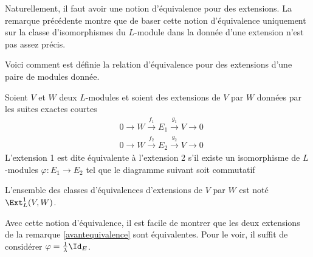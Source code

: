 Naturellement, il faut avoir une notion d'équivalence pour des extensions. La remarque précédente montre que de baser cette notion d'équivalence uniquement sur la classe d'isomorphismes du $L$-module dans la donnée d'une extension n'est pas assez précis. 

Voici comment est définie la relation d'équivalence pour des extensions d'une paire de modules donnée. 

\begin{Def} \label{GROS} Soient $V$ et $W$ deux $L$-modules et soient des extensions de $V$ par $W$ données par les suites exactes courtes
\begin{align*}
&0 \rightarrow W \stackrel{f_1}{\longrightarrow} E_1 \stackrel{g_1}{\longrightarrow} V \rightarrow 0\\
&0 \rightarrow W \stackrel{f_2}{\longrightarrow} E_2 \stackrel{g_2}{\longrightarrow} V \rightarrow 0
\end{align*}
L'extension 1 est dite équivalente à l'extension 2 s'il existe un isomorphisme de $L$-modules $\varphi : E_1 \rightarrow E_2$ tel que le diagramme suivant soit commutatif
\begin{center} \end{center}

L'ensemble des classes d'équivalences d'extensions de $V$ par $W$ est noté $\Ext_L^1(V,W)$.
\end{Def}

\begin{Rem} Avec cette notion d'équivalence, il est facile de montrer que les deux extensions de la remarque \ref{avantequivalence} sont équivalentes. Pour le voir, il suffit de considérer $\varphi = \frac{1}{\lambda}\Id_E$.
\end{Rem}


